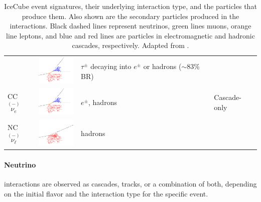 \begin{table}[h]
\begin{center}
\begin{tabular}{ m{1.8cm} m{2.0cm} m{3.0cm} m{1.8cm} }
            \cmidrule{2-4}

            & \includegraphics[width=2cm]{figures/neutrinos_properties/interaction_schematics/nutau_CC_cascadeonly.pdf}
            & $\tau^\pm$ decaying into $e^\pm$ or hadrons ($\sim$83\% BR)  
            & {} \\

            \cmidrule{1-3} CC $\overset{(-)}{\nu_e}$ 
            & \includegraphics[width=2cm]{figures/neutrinos_properties/interaction_schematics/nue_CC_cascadeonly.pdf}
            & $e^\pm$, hadrons & {Cascade-only} \\

            \cmidrule{1-3}

            NC $\overset{(-)}{\nu_\ell}$ 
            & \includegraphics[width=2cm]{figures/neutrinos_properties/interaction_schematics/nuall_NC_cascadeonly.pdf} 
            & hadrons &  {} \\

            \hline
        \end{tabular}
    \end{center}
    \caption[IceCube event signatures and underlying interactions]{IceCube event signatures, their underlying interaction type, and the particles that produce them. Also shown are the secondary particles produced in the interactions. Black dashed lines represent neutrinos, green lines muons, orange line leptons, and blue and red lines are particles in electromagnetic and hadronic cascades, respectively. Adapted from \cite{ATerliuk}.}
\end{table}


\paragraph{Neutrino} interactions are observed as cascades, tracks, or a combination of both, depending on the initial flavor and the interaction type for the specific event.

